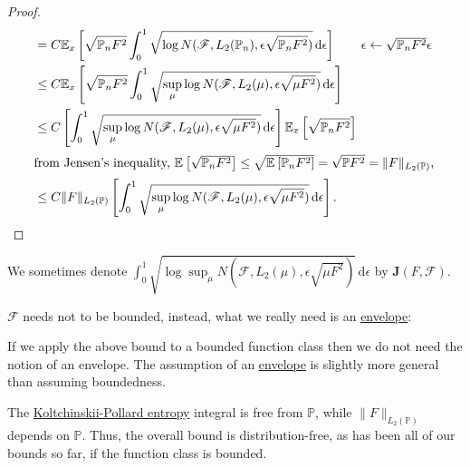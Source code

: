 \begin{proof}
\begin{align*}
		 & = C \mathbb{E}_{x}\left[ \sqrt{\mathbb{P} _n F^2} \int_{0}^{1} \sqrt{\log N(\mathscr{F} , L_2(\mathbb{P} _n), \epsilon \sqrt{\mathbb{P} _n F^2} )} \,\mathrm{d}\epsilon \right]  \tag*{\(\epsilon \gets \sqrt{\mathbb{P} _n F^2} \epsilon  \) }                                                                                                          \\
		 & \leq C \mathbb{E}_{x}\left[\sqrt{\mathbb{P} _n F^2} \int_{0}^{1} \sqrt{\sup _\mu \log N(\mathscr{F} , L_2(\mu ), \epsilon \sqrt{\mu F^2} )} \,\mathrm{d}\epsilon \right]                                                                                                                                                                                 \\
		 & \leq C \left[ \int_{0}^{1} \sqrt{\sup _\mu \log N(\mathscr{F} , L_2(\mu ), \epsilon \sqrt{\mu F^2} )} \,\mathrm{d}\epsilon \right] \mathbb{E}_{x}\left[\sqrt{\mathbb{P} _n F^2}  \right]                                                                                                                                                                 \\
		\shortintertext{from Jensen's inequality, \(\mathbb{E}_{}\left[\sqrt{\mathbb{P} _n F^2} \right] \leq \sqrt{\mathbb{E}_{}\left[\mathbb{P} _n F^2 \right] } = \sqrt{\mathbb{P} F^2} = \lVert F \rVert _{L_2(\mathbb{P} )}\),}
		 & \leq C \lVert F \rVert _{L_2(\mathbb{P} )} \left[ \int_{0}^{1} \sqrt{\sup _\mu \log N(\mathscr{F} , L_2(\mu ), \epsilon \sqrt{\mu F^2} )} \,\mathrm{d}\epsilon \right] .
	\end{align*}
\end{proof}

\begin{notation}
	We sometimes denote \(\displaystyle \int_{0}^{1} \sqrt{\log \sup _\mu N(\mathscr{F} , L_2(\mu ), \epsilon \sqrt{\mu F^2} )}  \,\mathrm{d}\epsilon \) by \(\bm{J} (F, \mathscr{F} )\).
\end{notation}

\(\mathscr{F} \) needs not to be bounded, instead, what we really need is an \hyperref[def:envelope]{envelope}:
\begin{remark}
	If we apply the above bound to a bounded function class then we do not need the notion of an envelope. The assumption of an \hyperref[def:envelope]{envelope} is slightly more general than assuming boundedness.
\end{remark}

\begin{remark}
	The \hyperref[def:Koltchinskii-Pollard-entropy]{Koltchinskii-Pollard entropy} integral is free from \(\mathbb{P} \), while \(\lVert F \rVert _{L_2(\mathbb{P} )}\) depends on \(\mathbb{P} \). Thus, the overall bound is distribution-free, as has been all of our bounds so far, if the function class is bounded.
\end{remark}

